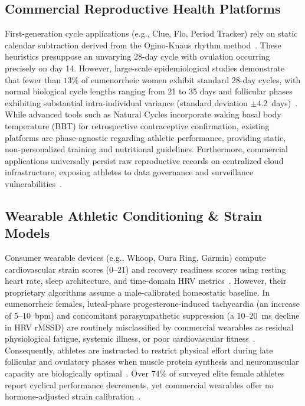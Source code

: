 \documentclass[conference]{IEEEtran}
\begin{document}
\subsection{Commercial Reproductive Health Platforms}
First-generation cycle applications (e.g., Clue, Flo, Period Tracker) rely on static calendar subtraction derived from the Ogino-Knaus rhythm method~\cite{treloar1967}. These heuristics presuppose an unvarying 28-day cycle with ovulation occurring precisely on day 14. However, large-scale epidemiological studies demonstrate that fewer than $13\%$ of eumenorrheic women exhibit standard 28-day cycles, with normal biological cycle lengths ranging from 21 to 35 days and follicular phases exhibiting substantial intra-individual variance (standard deviation $\pm 4.2$~days)~\cite{bull2019}. While advanced tools such as Natural Cycles incorporate waking basal body temperature (BBT) for retrospective contraceptive confirmation, existing platforms are phase-agnostic regarding athletic performance, providing static, non-personalized training and nutritional guidelines. Furthermore, commercial applications universally persist raw reproductive records on centralized cloud infrastructure, exposing athletes to data governance and surveillance vulnerabilities~\cite{mozilla2023, flo2023}.

\subsection{Wearable Athletic Conditioning \& Strain Models}
Consumer wearable devices (e.g., Whoop, Oura Ring, Garmin) compute cardiovascular strain scores ($0$--$21$) and recovery readiness scores using resting heart rate, sleep architecture, and time-domain HRV metrics~\cite{whoop2023}. However, their proprietary algorithms assume a male-calibrated homeostatic baseline. In eumenorrheic females, luteal-phase progesterone-induced tachycardia (an increase of $5$--$10$~bpm) and concomitant parasympathetic suppression (a $10$--$20$~ms decline in HRV rMSSD) are routinely misclassified by commercial wearables as residual physiological fatigue, systemic illness, or poor cardiovascular fitness~\cite{bruinvels2022, bull2019}. Consequently, athletes are instructed to restrict physical effort during late follicular and ovulatory phases when muscle protein synthesis and neuromuscular capacity are biologically optimal~\cite{sims2021, mcnulty2020}. Over $74\%$ of surveyed elite female athletes report cyclical performance decrements, yet commercial wearables offer no hormone-adjusted strain calibration~\cite{mcnulty2020}.
\end{document}
